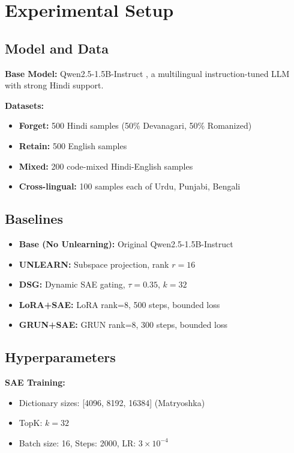 \documentclass[11pt]{article}
\begin{document}
\section{Experimental Setup}

\subsection{Model and Data}

\textbf{Base Model:} Qwen2.5-1.5B-Instruct \cite{qwen2024}, a multilingual instruction-tuned LLM with strong Hindi support.

\textbf{Datasets:}
\begin{itemize}
    \item \textbf{Forget:} 500 Hindi samples (50\% Devanagari, 50\% Romanized)
    \item \textbf{Retain:} 500 English samples
    \item \textbf{Mixed:} 200 code-mixed Hindi-English samples
    \item \textbf{Cross-lingual:} 100 samples each of Urdu, Punjabi, Bengali
\end{itemize}

\subsection{Baselines}

\begin{itemize}
    \item \textbf{Base (No Unlearning):} Original Qwen2.5-1.5B-Instruct
    \item \textbf{UNLEARN:} Subspace projection, rank $r=16$
    \item \textbf{DSG:} Dynamic SAE gating, $\tau=0.35$, $k=32$
    \item \textbf{LoRA+SAE:} LoRA rank=8, 500 steps, bounded loss
    \item \textbf{GRUN+SAE:} GRUN rank=8, 300 steps, bounded loss
\end{itemize}

\subsection{Hyperparameters}

\textbf{SAE Training:}
\begin{itemize}
    \item Dictionary sizes: [4096, 8192, 16384] (Matryoshka)
    \item TopK: $k=32$
    \item Batch size: 16, Steps: 2000, LR: $3 \times 10^{-4}$
\end{itemize}
\end{document}
